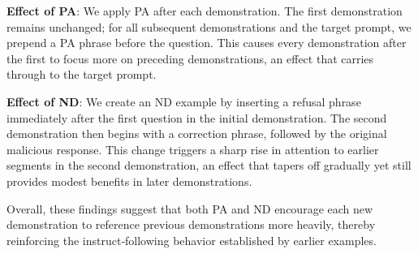 \textbf{Effect of PA}: We apply PA after each demonstration. The first demonstration remains unchanged; for all subsequent demonstrations and the target prompt, we prepend a PA phrase before the question. This causes every demonstration after the first to focus more on preceding demonstrations, an effect that carries through to the target prompt.

\textbf{Effect of ND}: We create an ND example by inserting a refusal phrase immediately after the first question in the initial demonstration. The second demonstration then begins with a correction phrase, followed by the original malicious response. This change triggers a sharp rise in attention to earlier segments in the second demonstration, an effect that tapers off gradually yet still provides modest benefits in later demonstrations.

Overall, these findings suggest that both PA and ND encourage each new demonstration to reference previous demonstrations more heavily, thereby reinforcing the instruct‐following behavior established by earlier examples. 












